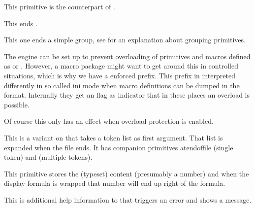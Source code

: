This primitive is the counterpart of .

\stopnewprimitive

\startnewprimitive[title={\prm {endmvl}}]

This ends .

\stopnewprimitive

\startnewprimitive[title={\prm {endsimplegroup}}]

This one ends a simple group, see  for an explanation
about grouping primitives.

\stopnewprimitive

\startnewprimitive[title={\prm {enforced}}]

The engine can be set up to prevent overloading of primitives and macros defined
as  or . However, a macro package might want
to get around this in controlled situations, which is why we have a \prm
{enforced} prefix. This prefix in interpreted differently in so called \quote
{ini} mode when macro definitions can be dumped in the format. Internally they
get an  flag as indicator that in these places an overload is
possible.

\starttyping
\permanent{}

\def\oof         {\def\foo{fails}}
\def\oof{\enforced\def\foo{succeeds}}
\stoptyping

Of course this only has an effect when overload protection is enabled.

\stopnewprimitive

\startoldprimitive[title={\prm {eofinput}}]

This is a variant on  that takes a token list as first argument. That
list is expanded when the file ends. It has companion primitives \prm
{atendoffile} (single token) and  (multiple tokens).

\stopoldprimitive

\startoldprimitive[title={\prm {eqno}}]

This primitive stores the (typeset) content (presumably a number) and when the
display formula is wrapped that number will end up right of the formula.

\stopoldprimitive

\startoldprimitive[title={\prm {errhelp}}]

This is additional help information to  that triggers an error
and shows a message.

